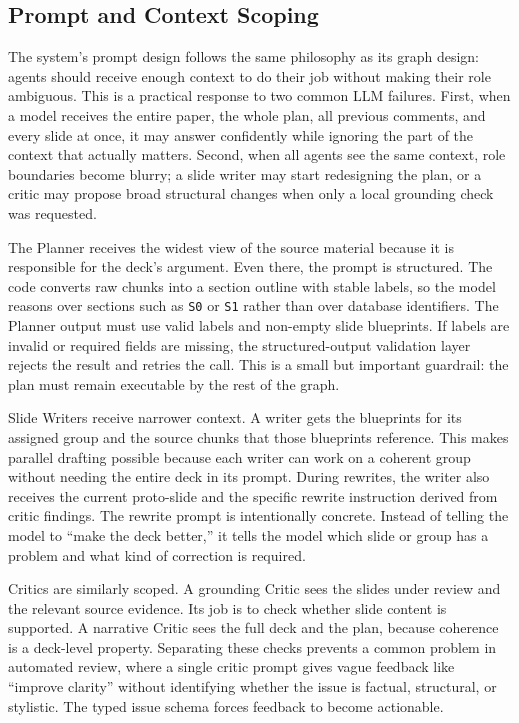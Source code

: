 \documentclass[11pt]{article}
\begin{document}
\subsection{Prompt and Context Scoping}

The system's prompt design follows the same philosophy as its graph design: agents should receive enough context to do their job without making their role ambiguous. This is a practical response to two common LLM failures. First, when a model receives the entire paper, the whole plan, all previous comments, and every slide at once, it may answer confidently while ignoring the part of the context that actually matters. Second, when all agents see the same context, role boundaries become blurry; a slide writer may start redesigning the plan, or a critic may propose broad structural changes when only a local grounding check was requested.

The Planner receives the widest view of the source material because it is responsible for the deck's argument. Even there, the prompt is structured. The code converts raw chunks into a section outline with stable labels, so the model reasons over sections such as \texttt{S0} or \texttt{S1} rather than over database identifiers. The Planner output must use valid labels and non-empty slide blueprints. If labels are invalid or required fields are missing, the structured-output validation layer rejects the result and retries the call. This is a small but important guardrail: the plan must remain executable by the rest of the graph.

Slide Writers receive narrower context. A writer gets the blueprints for its assigned group and the source chunks that those blueprints reference. This makes parallel drafting possible because each writer can work on a coherent group without needing the entire deck in its prompt. During rewrites, the writer also receives the current proto-slide and the specific rewrite instruction derived from critic findings. The rewrite prompt is intentionally concrete. Instead of telling the model to ``make the deck better,'' it tells the model which slide or group has a problem and what kind of correction is required.

Critics are similarly scoped. A grounding Critic sees the slides under review and the relevant source evidence. Its job is to check whether slide content is supported. A narrative Critic sees the full deck and the plan, because coherence is a deck-level property. Separating these checks prevents a common problem in automated review, where a single critic prompt gives vague feedback like ``improve clarity'' without identifying whether the issue is factual, structural, or stylistic. The typed issue schema forces feedback to become actionable.
\end{document}
